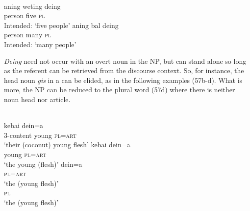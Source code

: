 \ea%
\label{ex:9:56}
 \\
\ea
\gll *aning    weting deing \\
    person five \textsc{pl} \\
 \glt Intended: `five people'
\ex
\gll *aning bal {deing}\\
   person many   \textsc{pl} \\
\glt  Intended: `many people'
\z
\z






\textit{Deing} need not occur with an overt noun in the NP, but can stand alone so long as the referent can be retrieved from the discourse context. So, for instance, the head noun \textit{gis} in a can be elided, as in the following examples (57b-d). What is more, the NP can be reduced to the plural word (57d) where there is neither noun head nor article.


\ea%
\label{ex:9:57}
 \\
\ea
{}    kebai dein=a\\
3-content young \textsc{pl=art}  \\
\glt `their (coconut) young flesh'
\ex
\gll kebai dein=a   \\
   young \textsc{pl=art}  \\
\glt `the young (flesh)' 
\ex
\gll dein=a   \\
   \textsc{pl=art}  \\
\glt  `the (young flesh)'
\ex
{}\\
    \textsc{pl}\\
\glt  `the (young flesh)'
\z
\z




